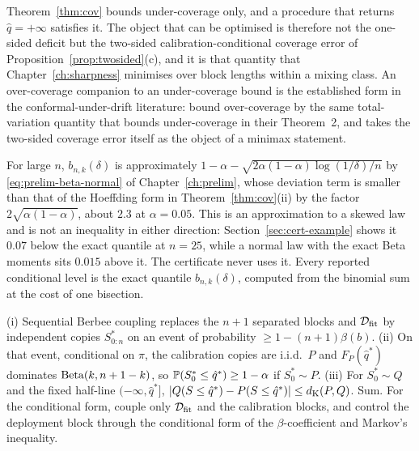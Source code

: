 \documentclass[../../../main.tex]{subfiles}
\begin{document}
\begin{remark}\label{rem:twosided}
Theorem~\ref{thm:cov} bounds under-coverage only, and a procedure that returns $\hat q=+\infty$ satisfies it. The object that can be optimised is therefore not the one-sided deficit but the two-sided calibration-conditional coverage error of Proposition~\ref{prop:twosided}(c), and it is that quantity that Chapter~\ref{ch:sharpness} minimises over block lengths within a mixing class. An over-coverage companion to an under-coverage bound is the established form in the conformal-under-drift literature: \citep[Thm.~3]{barber2023} bound over-coverage by the same total-variation quantity that bounds under-coverage in their Theorem~2, and \citep[Thm.~2]{halkiewicz2026} takes the two-sided coverage error itself as the object of a minimax statement.
\end{remark}

\begin{remark}\label{rem:betaapprox}
For large $n$, $b_{n,k}(\delta)$ is approximately $1-\alpha-\sqrt{2\alpha(1-\alpha)\log(1/\delta)/n}$ by \eqref{eq:prelim-beta-normal} of Chapter~\ref{ch:prelim}, whose deviation term is smaller than that of the Hoeffding form in Theorem~\ref{thm:cov}(ii) by the factor $2\sqrt{\alpha(1-\alpha)}$, about $2.3$ at $\alpha=0.05$. This is an approximation to a skewed law and is not an inequality in either direction: Section~\ref{sec:cert-example} shows it $0.07$ below the exact quantile at $n=25$, while a normal law with the exact Beta moments sits $0.015$ above it. The certificate never uses it. Every reported conditional level is the exact quantile $b_{n,k}(\delta)$, computed from the binomial sum at the cost of one bisection.
\end{remark}

\begin{route}
(i) Sequential Berbee coupling replaces the $n+1$ separated blocks and $\mathcal D_{\mathrm{fit}}$ by independent copies $S^*_{0:n}$ on an event of probability $\ge1-(n+1)\beta(b)$. (ii) On that event, conditional on $\pi$, the calibration copies are i.i.d.\ $P$ and $F_P(\hat q^*)$ dominates $\operatorname{Beta}(k,n+1-k)$, so $\mathbb{P}(S^*_0\le\hat q^*)\ge1-\alpha$ if $S^*_0\sim P$. (iii) For $S^*_0\sim Q$ and the fixed half-line $(-\infty,\hat q^*]$, $|Q(S\le\hat q^*)-P(S\le\hat q^*)|\le d_{\mathrm{K}}(P,Q)$. Sum. For the conditional form, couple only $\mathcal D_{\mathrm{fit}}$ and the calibration blocks, and control the deployment block through the conditional form of the $\beta$-coefficient and Markov's inequality.
\end{route}
\end{document}
